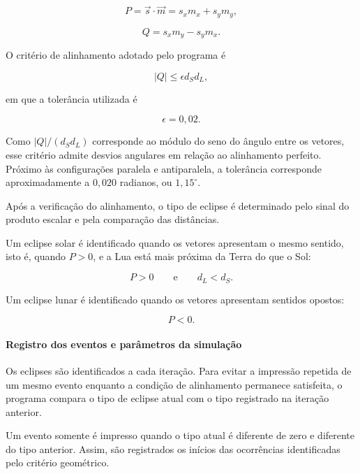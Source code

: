 \documentclass[12pt,a4paper]{article}
\begin{document}
\begin{equation}
    P=\vec{s}\cdot\vec{m}
    =s_xm_x+s_ym_y,
\end{equation}

\begin{equation}
    Q=s_xm_y-s_ym_x.
\end{equation}

O critério de alinhamento adotado pelo programa é

\begin{equation}
    |Q|\leq\epsilon d_Sd_L,
\end{equation}

em que a tolerância utilizada é

\begin{equation}
    \epsilon=0,02.
\end{equation}

Como $|Q|/(d_Sd_L)$ corresponde ao módulo do seno do ângulo entre os vetores, esse critério admite desvios angulares em relação ao alinhamento perfeito. Próximo às configurações paralela e antiparalela, a tolerância corresponde aproximadamente a $0,020$ radianos, ou $1,15^\circ$.

Após a verificação do alinhamento, o tipo de eclipse é determinado pelo sinal do produto escalar e pela comparação das distâncias.

Um eclipse solar é identificado quando os vetores apresentam o mesmo sentido, isto é, quando $P>0$, e a Lua está mais próxima da Terra do que o Sol:

\begin{equation}
    P>0
    \qquad\text{e}\qquad
    d_L<d_S.
\end{equation}

Um eclipse lunar é identificado quando os vetores apresentam sentidos opostos:

\begin{equation}
    P<0.
\end{equation}

\paragraph{Registro dos eventos e parâmetros da simulação}

Os eclipses são identificados a cada iteração. Para evitar a impressão repetida de um mesmo evento enquanto a condição de alinhamento permanece satisfeita, o programa compara o tipo de eclipse atual com o tipo registrado na iteração anterior.

Um evento somente é impresso quando o tipo atual é diferente de zero e diferente do tipo anterior. Assim, são registrados os inícios das ocorrências identificadas pelo critério geométrico.
\end{document}
